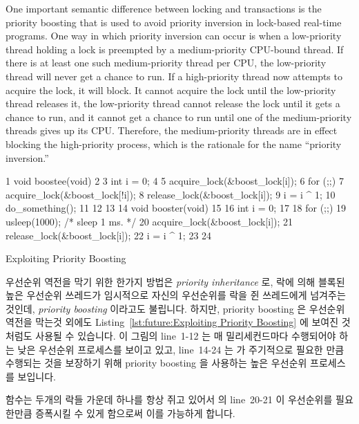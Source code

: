 One important semantic difference between locking and transactions
is the priority boosting that is used to avoid priority inversion
in lock-based real-time programs.
One way in which priority inversion can occur is when a
low-priority thread holding a lock
is preempted by a medium-priority CPU-bound thread.
If there is at least one such medium-priority thread per CPU, the
low-priority thread will never get a chance to run.
If a high-priority thread now attempts to acquire the lock,
it will block.
It cannot acquire the lock until the low-priority thread releases it,
the low-priority thread cannot release the lock until it gets a chance
to run, and it cannot get a chance to run until one of the medium-priority
threads gives up its CPU.
Therefore, the medium-priority threads are in effect blocking the
high-priority process, which is the rationale for the name ``priority
inversion.''
\fi

\begin{listing}[tbp]
{ \scriptsize
\begin{verbbox}
  1 void boostee(void)
  2 {
  3   int i = 0;
  4 
  5   acquire_lock(&boost_lock[i]);
  6   for (;;) {
  7     acquire_lock(&boost_lock[!i]);
  8     release_lock(&boost_lock[i]);
  9     i = i ^ 1;
 10     do_something();
 11   }
 12 }
 13 
 14 void booster(void)
 15 {
 16   int i = 0;
 17 
 18   for (;;) {
 19     usleep(1000); /* sleep 1 ms. */
 20     acquire_lock(&boost_lock[i]);
 21     release_lock(&boost_lock[i]);
 22     i = i ^ 1;
 23   }
 24 }
\end{verbbox}
}
\centering
\theverbbox
\caption{Exploiting Priority Boosting}
\label{lst:future:Exploiting Priority Boosting}
\end{listing}

우선순위 역전을 막기 위한 한가지 방법은 \emph{priority inheritance} 로, 락에
의해 블록된 높은 우선순위 쓰레드가 임시적으로 자신의 우선순위를 락을 쥔
쓰레드에게 넘겨주는 것인데, \emph{priority boosting} 이라고도 불립니다.
하지만, priority boosting 은 우선순위 역전을 막는것 외에도
Listing~\ref{lst:future:Exploiting Priority Boosting} 에 보여진 것처럼도 사용될
수 있습니다.
이 그림의 line~1-12 는 매 밀리세컨드마다 수행되어야 하는 낮은 우선순위
프로세스를 보이고 있고, line~14-24 는  가 주기적으로 필요한 만큼
수행되는 것을 보장하기 위해 priority boosting 을 사용하는 높은 우선순위
프로세스를 보입니다.

 함수는 두개의  락들 가운데 하나를 항상 쥐고
있어서  의 line~20-21 이 우선순위를 필요한만큼 증폭시킬 수 있게
함으로써 이를 가능하게 합니다.
\iffalse

